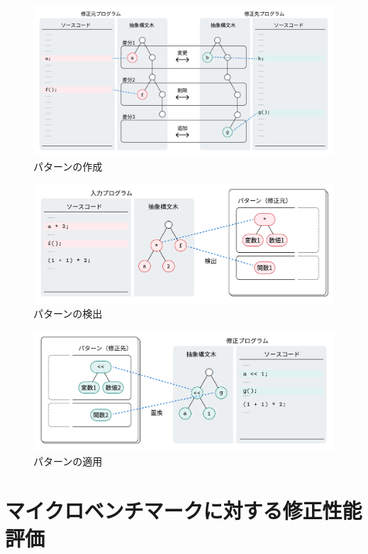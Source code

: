 \documentclass[11pt]{jreport}
\begin{document}
\begin{figure}[t]
\centerline{\includegraphics[width=0.8\linewidth]{Omori_fig/pattern-create.pdf}}
\caption{パターンの作成}
\label{fig:pattern:create}
\end{figure}

\begin{figure}[t]
\centerline{\includegraphics[width=0.8\linewidth]{Omori_fig/pattern-match.pdf}}
\caption{パターンの検出}
\label{fig:pattern:match}
\end{figure}

\begin{figure}[t]
\centerline{\includegraphics[width=0.8\linewidth]{Omori_fig/pattern-repair.pdf}}
\caption{パターンの適用}
\label{fig:pattern:repair}
\end{figure}




\chapter{マイクロベンチマークに対する修正性能評価}\label{chapter:eval-1}
\end{document}
